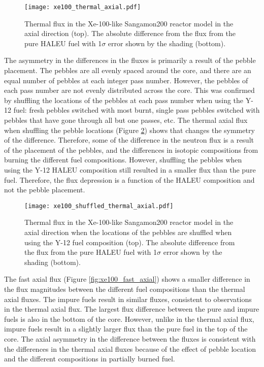 \begin{figure}[ht]
        \centering 
        \texttt{[image: xe100\_thermal\_axial.pdf]}
        \caption{Thermal flux in the Xe-100-like Sangamon200 
        reactor model in the axial direction (top). The absolute 
        difference from the flux from 
        the pure \gls{HALEU} fuel with 1$\sigma$ error shown by 
        the shading (bottom).}
        \label{fig:xe100_thermal_axial}
\end{figure}

The asymmetry in the differences in 
the fluxes is primarily a result of the pebble placement. The 
pebbles are all evenly spaced around the core, and there are an equal 
number of pebbles at each integer pass number. However, the pebbles of 
each pass number are not evenly distributed across the core. 
This was confirmed by shuffling the locations of the pebbles at each 
pass number when using the Y-12 fuel: fresh pebbles switched with most 
burnt, single pass pebbles switched with pebbles that have gone through 
all but one passes, etc. The thermal axial flux when shuffling the 
pebble locations (Figure \ref{fig:xe100_pebble_shuffle}) shows that 
changes the symmetry of the difference. Therefore, some of the difference 
in the neutron flux is a result of the placement of the pebbles, and 
the differences in isotopic compositions from burning the different 
fuel compositions. However, shuffling the pebbles when using the Y-12 
\gls{HALEU} composition still resulted in a smaller flux than the 
pure fuel. Therefore, the flux depression is a function of the 
\gls{HALEU} composition and not the pebble placement.

\begin{figure}[ht]
        \centering 
        \texttt{[image: xe100\_shuffled\_thermal\_axial.pdf]}
        \caption{Thermal flux in the Xe-100-like Sangamon200 
        reactor model in the axial direction when the locations of 
        the pebbles are shuffled when using the Y-12 fuel composition
        (top). The absolute difference from the flux from 
        the pure \gls{HALEU} fuel with 1$\sigma$ error shown by 
        the shading (bottom).}
        \label{fig:xe100_pebble_shuffle}
\end{figure}

The fast axial flux (Figure \ref{fig:xe100_fast_axial}) shows a smaller 
difference in the flux magnitudes between the different fuel compositions 
than the thermal axial fluxes. The 
impure fuels result in similar fluxes, consistent to observations in 
the thermal axial flux. The largest flux difference between the pure 
and impure fuels is also in the bottom of the core. However, unlike 
in the thermal axial flux, impure fuels result in a slightly larger 
flux than the pure fuel in the top of the core. The axial asymmetry in 
the difference between the fluxes is consistent with the differences in 
the thermal axial fluxes because of the effect of pebble location 
and the different compositions in partially burned fuel. 

